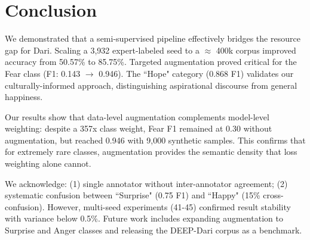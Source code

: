 \documentclass[runningheads]{llncs}
\begin{document}
\section{Conclusion}

We demonstrated that a semi-supervised pipeline effectively bridges the resource 
gap for Dari. Scaling a 3,932 expert-labeled seed to a $\approx$ 400k corpus improved 
accuracy from 50.57\% to 85.75\%. Targeted augmentation proved critical for 
the Fear class (F1: 0.143 $\rightarrow$ 0.946). The ``Hope" category (0.868 F1) 
validates our culturally-informed approach, distinguishing aspirational 
discourse from general happiness.

Our results show that data-level augmentation complements model-level 
weighting: despite a 357x class weight, Fear F1 remained at 0.30 without 
augmentation, but reached 0.946 with 9,000 synthetic samples. This confirms 
that for extremely rare classes, augmentation provides the semantic density 
that loss weighting alone cannot.

We acknowledge: (1) single annotator without inter-annotator agreement; 
(2) systematic confusion between ``Surprise" (0.75 F1) and ``Happy" (15\% 
cross-confusion). However, multi-seed experiments (41-45) confirmed 
result stability with variance below 0.5\%. Future work includes expanding 
augmentation to Surprise and Anger classes and releasing the DEEP-Dari 
corpus as a benchmark. 
\newpage
\small




%
% 
%
\end{document}
